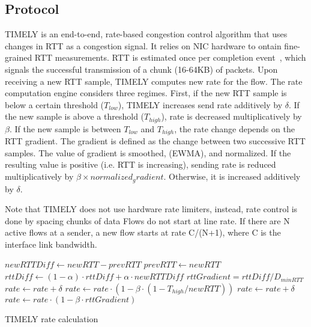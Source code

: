 \subsection{Protocol}

TIMELY is an end-to-end, rate-based congestion control algorithm that uses
changes in RTT as a congestion signal.  It relies on NIC hardware to ontain
fine-grained RTT measurements. RTT is estimated once per completion
event~\cite{rocev2}, which signals the successful transmission of a chunk
(16-64KB) of packets. Upon receiving a new RTT sample, TIMELY computes new rate
for the flow.   The rate computation engine considers three regimes. First, if
the new RTT sample is below a certain threshold ($T_{low}$), TIMELY increases
send rate additively by $\delta$. If the new sample is above a threshold
($T_{high}$), rate is decreased multiplicatively by $\beta$. If the new sample
is between $T_{low}$ and $T_{high}$, the rate change depends on the RTT
gradient.  The gradient is defined as the change between two successive RTT
samples. The value of gradient is smoothed, (EWMA), and normalized. If the
resulting value is positive (i.e. RTT is increasing), sending rate is reduced
multiplicatively by $\beta \times normalized_gradient$.  Otherwise, it is
increased additively by $\delta$.

Note that TIMELY does not use hardware rate limiters, instead, rate control is
done by spacing chunks of data Flows do not start at line rate. If there are N
active flows at a sender, a new flow starts at rate C/(N+1), where C is the
interface link bandwidth.

\begin{algorithm}[t]
\footnotesize
{
\begin{algorithmic}[1]
\State $newRTTDiff \gets newRTT - prevRTT$
\State $prevRTT \gets newRTT$
\State $rttDiff \gets (1-\alpha) \cdot rttDiff + \alpha \cdot newRTTDiff$
\State $rttGradient = rttDiff/D_{minRTT}$
        \State $rate \gets rate + \delta$
        \State $rate \gets rate \cdot  (1 - \beta \cdot (1 - T_{high}/newRTT))$
        \State $rate \gets rate + \delta$
\Else
        \State $rate \gets rate \cdot (1 - \beta \cdot rttGradient)$
\EndIf 
\end{algorithmic}
}
\caption{TIMELY rate calculation}
\end{algorithm}

